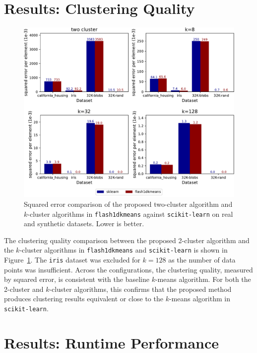\section{Results: Clustering Quality}\label{sec:clustering_quality}

\begin{figure}[H]
    \includegraphics[width=\textwidth]{figures/inertia_comparison.pdf}
    \caption{Squared error comparison of the proposed two-cluster algorithm and $k$-cluster algorithms in \texttt{flash1dkmeans} against \texttt{scikit-learn} on real and synthetic datasets. Lower is better.}
    \label{fig:inertia_comparison}
\end{figure}

The clustering quality comparison between the proposed 2-cluster algorithm and the $k$-cluster algorithms in \texttt{flash1dkmeans} and \texttt{scikit-learn} is shown in Figure~\ref{fig:inertia_comparison}. The \texttt{iris} dataset was excluded for $k=128$ as the number of data points was insufficient. Across the configurations, the clustering quality, measured by squared error, is consistent with the baseline $k$-means algorithm. For both the 2-cluster and $k$-cluster algorithms, this confirms that the proposed method produces clustering results equivalent or close to the $k$-means algorithm in \texttt{scikit-learn}.

\section{Results: Runtime Performance}\label{sec:runtime_performance}

